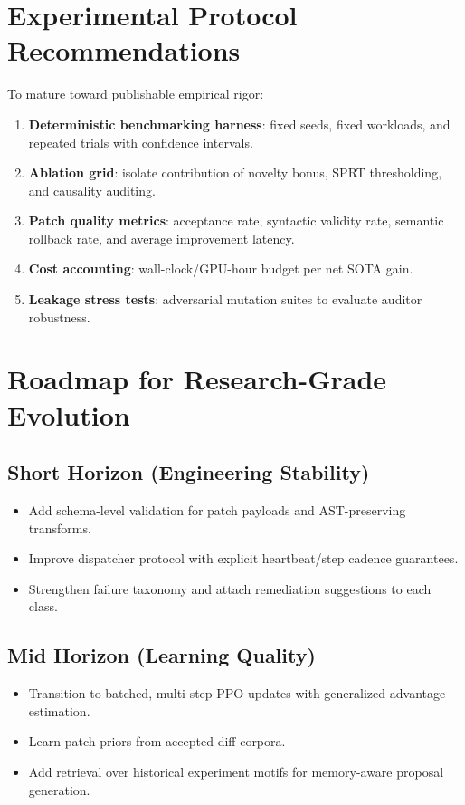 \documentclass[11pt]{article}
\begin{document}
\section{Experimental Protocol Recommendations}
To mature toward publishable empirical rigor:
\begin{enumerate}[leftmargin=1.5em]
    \item \textbf{Deterministic benchmarking harness}: fixed seeds, fixed workloads, and repeated trials with confidence intervals.
    \item \textbf{Ablation grid}: isolate contribution of novelty bonus, SPRT thresholding, and causality auditing.
    \item \textbf{Patch quality metrics}: acceptance rate, syntactic validity rate, semantic rollback rate, and average improvement latency.
    \item \textbf{Cost accounting}: wall-clock/GPU-hour budget per net SOTA gain.
    \item \textbf{Leakage stress tests}: adversarial mutation suites to evaluate auditor robustness.
\end{enumerate}

\section{Roadmap for Research-Grade Evolution}
\subsection{Short Horizon (Engineering Stability)}
\begin{itemize}[leftmargin=1.5em]
    \item Add schema-level validation for patch payloads and AST-preserving transforms.
    \item Improve dispatcher protocol with explicit heartbeat/step cadence guarantees.
    \item Strengthen failure taxonomy and attach remediation suggestions to each class.
\end{itemize}

\subsection{Mid Horizon (Learning Quality)}
\begin{itemize}[leftmargin=1.5em]
    \item Transition to batched, multi-step PPO updates with generalized advantage estimation.
    \item Learn patch priors from accepted-diff corpora.
    \item Add retrieval over historical experiment motifs for memory-aware proposal generation.
\end{itemize}
\end{document}
